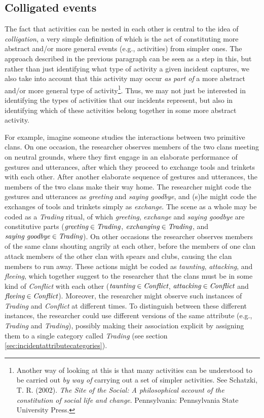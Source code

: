 \documentclass{memoir}
\begin{document}
\subsection{Colligated events}
\label{sec:colligatedevents}

The fact that activities can be nested in each other is central to the idea of \emph{colligation}, a very simple definition of which is the act of constituting more abstract and/or more general events (e.g., activities) from simpler ones. The approach described in the previous paragraph can be seen as a step in this, but rather than just identifying what type of activity a given incident captures, we also take into account that this activity may occur \emph{as part of} a more abstract and/or more general type of activity\footnote{Another way of looking at this is that many activities can be understood to be carried out \emph{by way of} carrying out a set of simpler activities. See Schatzki, T. R. (2002). \emph{The Site of the Social: A philosophical account of the constitution of social life and change}. Pennsylvania: Pennsylvania State University Press.}. Thus, we may not just be interested in identifying the types of activities that our incidents represent, but also in identifying which of these activities belong together in some more abstract activity.   

For example, imagine someone studies the interactions between two primitive clans. On one occasion, the researcher observes members of the two clans meeting on neutral grounds, where they first engage in  an elaborate performance of gestures and utterances, after which they proceed to exchange tools and trinkets with each other. After another elaborate sequence of gestures and utterances, the members of the two clans make their way home. The researcher might code the gestures and utterances as \emph{greeting} and \emph{saying goodbye}, and (s)he might code the exchanges of tools and trinkets simply as \emph{exchange}. The scene as a whole may be coded as a \emph{Trading} ritual, of which \emph{greeting}, \emph{exchange} and \emph{saying goodbye} are constitutive parts (\(\emph{greeting} \in \emph{Trading}\), \(\emph{exchanging} \in \emph{Trading}\), and \(\emph{saying goodbye} \in \emph{Trading}\)). On other occasions the researcher observes members of the same clans shouting angrily at each other, before the members of one clan attack members of the other clan with spears and clubs, causing the clan members to run away. These actions might be coded as \emph{taunting}, \emph{attacking}, and \emph{fleeing}, which together suggest to the researcher that the clans must be in some kind of \emph{Conflict} with each other (\(\emph{taunting} \in \emph{Conflict}\), \(\emph{attacking} \in \emph{Conflict}\) and \(\emph{fleeing} \in \emph{Conflict}\)). Moreover, the researcher might observe such instances of \emph{Trading} and \emph{Conflict} at different times. To distinguish between these different instances, the researcher could use different versions of the same attribute (e.g., \emph{Trading} and \emph{Trading}), possibly making their association explicit by assigning them to a single category called \emph{Trading} (see section \ref{sec:incidentattributecategories}).
\end{document}
